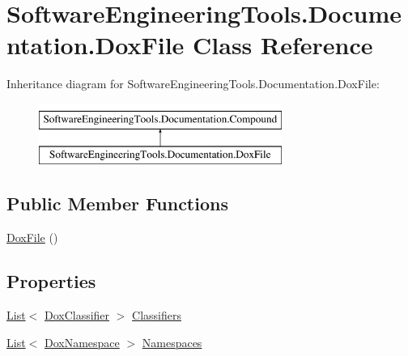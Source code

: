 \hypertarget{class_software_engineering_tools_1_1_documentation_1_1_dox_file}{\section{Software\+Engineering\+Tools.\+Documentation.\+Dox\+File Class Reference}
\label{class_software_engineering_tools_1_1_documentation_1_1_dox_file}
}
Inheritance diagram for Software\+Engineering\+Tools.\+Documentation.\+Dox\+File\+:\begin{figure}[H]
\begin{center}
\leavevmode
\includegraphics[height=2.000000cm]{class_software_engineering_tools_1_1_documentation_1_1_dox_file}
\end{center}
\end{figure}
\subsection*{Public Member Functions}
\begin{DoxyCompactItemize}
\item 
\hyperlink{class_software_engineering_tools_1_1_documentation_1_1_dox_file_a8b4d0a5b7282fb5054548c848d7310a2}{Dox\+File} ()
\end{DoxyCompactItemize}
\subsection*{Properties}
\begin{DoxyCompactItemize}
\item 
\hyperlink{namespace_software_engineering_tools_1_1_documentation_ae0bccf4f49a76db084c1c316e5954ec9a4ee29ca12c7d126654bd0e5275de6135}{List}$<$ \hyperlink{class_software_engineering_tools_1_1_documentation_1_1_dox_classifier}{Dox\+Classifier} $>$ \hyperlink{class_software_engineering_tools_1_1_documentation_1_1_dox_file_a968611bac6fb52fa6aa60f3586aa44fa}{Classifiers}
\item 
\hyperlink{namespace_software_engineering_tools_1_1_documentation_ae0bccf4f49a76db084c1c316e5954ec9a4ee29ca12c7d126654bd0e5275de6135}{List}$<$ \hyperlink{class_software_engineering_tools_1_1_documentation_1_1_dox_namespace}{Dox\+Namespace} $>$ \hyperlink{class_software_engineering_tools_1_1_documentation_1_1_dox_file_ac65f32ba25c936eb27093d7d0cd2d704}{Namespaces}
\end{DoxyCompactItemize}


